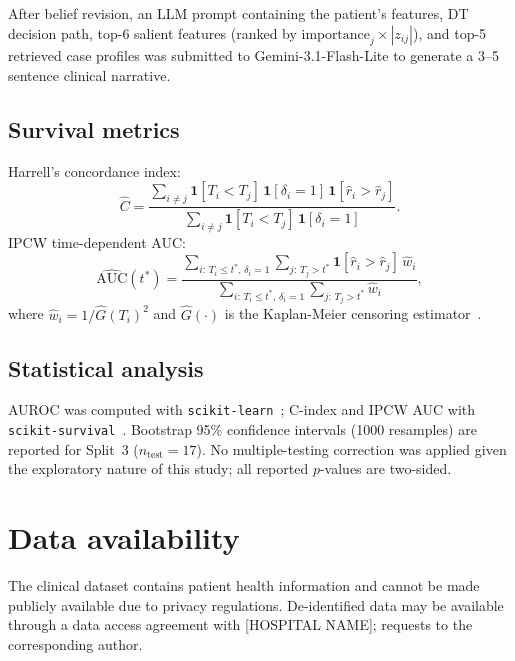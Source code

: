 \documentclass[pdflatex,sn-nature]{sn-jnl}
\begin{document}
After belief revision, an LLM prompt containing the patient's features,
DT decision path, top-6 salient features (ranked by
$\text{importance}_j \times |z_{ij}|$), and top-5 retrieved case
profiles was submitted to Gemini-3.1-Flash-Lite to generate a 3--5
sentence clinical narrative.

\subsection{Survival metrics}\label{sec:surv_methods}

Harrell's concordance index:
\begin{equation}
\hat{C} =
\frac{
  \sum_{i \neq j}
  \mathbf{1}[T_i < T_j]\,
  \mathbf{1}[\delta_i = 1]\,
  \mathbf{1}[\hat{r}_i > \hat{r}_j]
}{
  \sum_{i \neq j}
  \mathbf{1}[T_i < T_j]\,
  \mathbf{1}[\delta_i = 1]
}.
\label{eq:cindex}
\end{equation}
IPCW time-dependent AUC:
\begin{equation}
\widehat{\text{AUC}}(t^*) =
\frac{
  \sum_{i:\,T_i \leq t^*,\,\delta_i=1}
  \sum_{j:\,T_j > t^*}
  \mathbf{1}[\hat{r}_i > \hat{r}_j]\,\hat{w}_i
}{
  \sum_{i:\,T_i \leq t^*,\,\delta_i=1}
  \sum_{j:\,T_j > t^*}
  \hat{w}_i
},
\label{eq:itauc}
\end{equation}
where $\hat{w}_i = 1/\hat{G}(T_i)^2$ and $\hat{G}(\cdot)$ is the
Kaplan-Meier censoring estimator~\cite{[CITE:Uno2011]}.

\subsection{Statistical analysis}

AUROC was computed with \texttt{scikit-learn}~\cite{[CITE:sklearn]};
C-index and IPCW AUC with
\texttt{scikit-survival}~\cite{[CITE:sksurv]}.
Bootstrap 95\% confidence intervals (1000 resamples) are reported for
Split~3 ($n_\text{test}=17$).
No multiple-testing correction was applied given the exploratory nature
of this study; all reported $p$-values are two-sided.

\section*{Data availability}

The clinical dataset contains patient health information and cannot be
made publicly available due to privacy regulations.
De-identified data may be available through a data access agreement
with [HOSPITAL NAME]; requests to the corresponding author.
\end{document}
